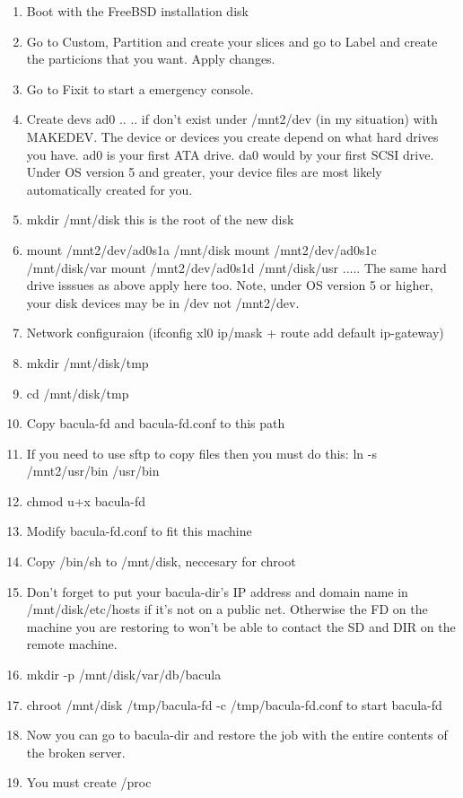 \begin{enumerate}
\item Boot with the FreeBSD installation disk 
\item Go to Custom, Partition and create your slices and go to Label and 
   create the particions that you want. Apply changes. 
\item Go to Fixit to start a emergency console. 
\item Create devs ad0 .. .. if don't exist under /mnt2/dev (in my  situation)
   with MAKEDEV. The device or devices you  create depend on what hard drives you
   have. ad0 is your  first ATA drive. da0 would by your first SCSI drive.  Under
OS version 5 and greater, your device files are  most likely automatically
created for you. 
\item mkdir /mnt/disk
   this is the root of the new disk 
\item mount /mnt2/dev/ad0s1a /mnt/disk
   mount /mnt2/dev/ad0s1c /mnt/disk/var
   mount /mnt2/dev/ad0s1d /mnt/disk/usr
.....
The same hard drive isssues as above apply here too.  Note, under OS version 5
or higher, your disk devices may  be in /dev not /mnt2/dev. 
\item Network configuraion (ifconfig xl0 ip/mask + route add default 
   ip-gateway) 
\item mkdir /mnt/disk/tmp 
\item cd /mnt/disk/tmp 
\item Copy bacula-fd and bacula-fd.conf to this path 
\item If you need to use sftp to copy files then you must do this:
   ln -s /mnt2/usr/bin /usr/bin 
\item chmod u+x bacula-fd 
\item Modify bacula-fd.conf to fit this machine 
\item Copy /bin/sh to /mnt/disk, neccesary for chroot 
\item Don't forget to put your bacula-dir's IP address and domain  name in
   /mnt/disk/etc/hosts if it's not on a public net.  Otherwise the FD on the
   machine you are restoring to  won't be able to contact the SD and DIR on the
remote machine. 
\item mkdir -p /mnt/disk/var/db/bacula 
\item chroot /mnt/disk /tmp/bacula-fd -c /tmp/bacula-fd.conf
   to start bacula-fd 
\item Now you can go to bacula-dir and restore the job with the entire 
   contents of the broken server. 
\item You must create /proc 
   \end{enumerate}

